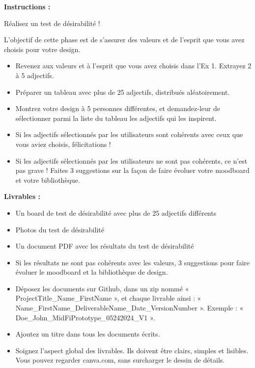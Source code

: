 \makeheaderfiles

\textbf{Instructions :}

Réalisez un test de désirabilité !

L'objectif de cette phase est de s'assurer des valeurs et de l'esprit que vous avez choisis pour votre design.

\begin{itemize}
\item Revenez aux valeurs et à l'esprit que vous avez choisis dans l'Ex 1. Extrayez 2 à 5 adjectifs.
\item Préparer un tableau avec plus de 25 adjectifs, distribués aléatoirement.
\item Montrez votre design à 5 personnes différentes, et demandez-leur de sélectionner parmi la liste du tableau les adjectifs qui les inspirent.
\item Si les adjectifs sélectionnés par les utilisateurs sont cohérents avec ceux que vous aviez choisis, félicitations !
\item Si les adjectifs sélectionnés par les utilisateurs ne sont pas cohérents, ce n'est pas grave ! Faites 3 suggestions sur la façon de faire évoluer votre moodboard et votre bibliothèque.
\end{itemize}

\textbf{Livrables :}

\begin{itemize}
\item Un board de test de désirabilité avec plus de 25 adjectifs différents
\item Photos du test de désirabilité
\item Un document PDF avec les résultats du test de désirabilité
\item Si les résultats ne sont pas cohérents avec les valeurs, 3 suggestions pour faire évoluer le moodboard et la bibliothèque de design.
\item Déposez les documents sur Github, dans un zip nommé « ProjectTitle\_Name\_FirstName », et chaque livrable ainsi : « Name\_FirstName\_DeliverableName\_Date\_VersionNumber ». Exemple : « Doe\_John\_MidFiPrototype\_05242024\_V1 ».
\item Ajoutez un titre dans tous les documents écrits.
\item Soignez l'aspect global des livrables. Ils doivent être clairs, simples et lisibles. Vous pouvez regarder canva.com, sans surcharger le dessin de détails.
\end{itemize}

